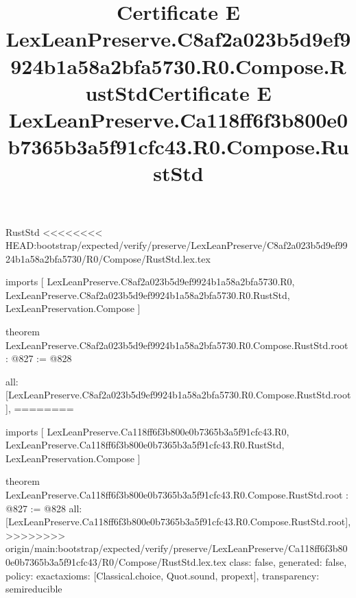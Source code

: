 \begin{lexlean}{RustStd}
<<<<<<<< HEAD:bootstrap/expected/verify/preserve/LexLeanPreserve/C8af2a023b5d9ef9924b1a58a2bfa5730/R0/Compose/RustStd.lex.tex
\title{Certificate E LexLeanPreserve.C8af2a023b5d9ef9924b1a58a2bfa5730.R0.Compose.RustStd}
\begin{coremodule}
imports [
  LexLeanPreserve.C8af2a023b5d9ef9924b1a58a2bfa5730.R0,
  LexLeanPreserve.C8af2a023b5d9ef9924b1a58a2bfa5730.R0.RustStd,
  LexLeanPreservation.Compose
]

theorem LexLeanPreserve.C8af2a023b5d9ef9924b1a58a2bfa5730.R0.Compose.RustStd.root : @827 := @828 {
  all: [LexLeanPreserve.C8af2a023b5d9ef9924b1a58a2bfa5730.R0.Compose.RustStd.root],
========
\title{Certificate E LexLeanPreserve.Ca118ff6f3b800e0b7365b3a5f91cfc43.R0.Compose.RustStd}
\begin{coremodule}
imports [
  LexLeanPreserve.Ca118ff6f3b800e0b7365b3a5f91cfc43.R0,
  LexLeanPreserve.Ca118ff6f3b800e0b7365b3a5f91cfc43.R0.RustStd,
  LexLeanPreservation.Compose
]

theorem LexLeanPreserve.Ca118ff6f3b800e0b7365b3a5f91cfc43.R0.Compose.RustStd.root : @827 := @828 {
  all: [LexLeanPreserve.Ca118ff6f3b800e0b7365b3a5f91cfc43.R0.Compose.RustStd.root],
>>>>>>>> origin/main:bootstrap/expected/verify/preserve/LexLeanPreserve/Ca118ff6f3b800e0b7365b3a5f91cfc43/R0/Compose/RustStd.lex.tex
  class: false,
  generated: false,
  policy: exact{axioms: [Classical.choice, Quot.sound, propext]},
  transparency: semireducible
}


\end{coremodule}}
\end{coremodule}
\end{lexlean}
